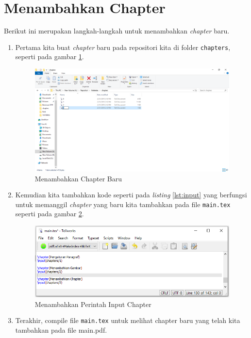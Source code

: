 \section{Menambahkan Chapter}
Berikut ini merupakan langkah-langkah untuk menambahkan \textit{chapter} baru.
\begin{enumerate}
\item Pertama kita buat \textit{chapter} baru pada repositori kita di folder \verb|chapters|, seperti pada gambar \ref{fig:tambahchapter}.

\begin{figure}[!htbp]
  \centering
  \includegraphics[width=.75\textwidth]{figures/tambahchapter.png}
  \caption{Menambahkan Chapter Baru}\label{fig:tambahchapter}
\end{figure}

\item Kemudian kita tambahkan kode seperti pada \textit{listing} \ref{lst:input} yang berfungsi untuk memanggil \textit{chapter} yang baru kita tambahkan pada file \verb|main.tex| seperti pada gambar \ref{fig:inputchapter}.



\begin{figure}[!htbp]
  \centering
  \includegraphics[width=.75\textwidth]{figures/inputchapter.png}
  \caption{Menambahkan Perintah Input Chapter}\label{fig:inputchapter}
\end{figure}

\item Terakhir, compile file \verb|main.tex| untuk melihat chapter baru yang telah kita tambahkan pada file main.pdf.
\end{enumerate}